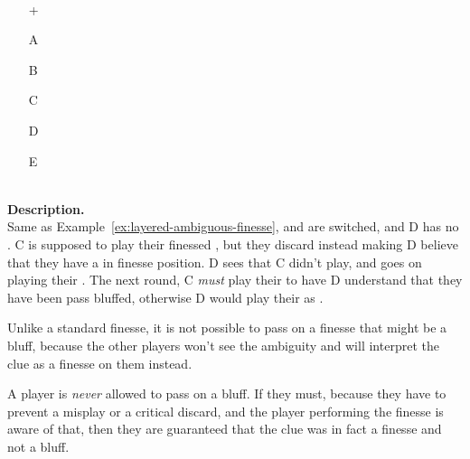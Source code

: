 \begin{example}	\hfill \\
	\begin{minipage}{0.45\textwidth}
		\begin{itemize}
			\item[\Large +]      
			\item[\Large A]    
			\item[\Large B]    
			\item[\Large C]     
			\item[\Large D]    
			\item[\Large E]    
		\end{itemize}
	\end{minipage}%
	\begin{minipage}{0.55\textwidth}
		\hfill \\
		
		\textbf{Description.} \\
		
		Same as Example~\ref{ex:layered-ambiguous-finesse},  and  are switched, and D has no . C is supposed to play their finessed , but they discard instead making D believe that they have a  in finesse position. D sees that C didn't play, and goes on playing their . The next round, C \emph{must} play their  to have D understand that they have been pass bluffed, otherwise D would play their  as .
	\end{minipage}
\end{example} \vspace{0.15 cm}

Unlike a standard finesse, it is not possible to pass on a finesse that might be a bluff, because the other players won't see the ambiguity and will interpret the clue as a finesse on them instead.

\begin{convention}
	A player is \emph{never} allowed to pass on a bluff. If they must, because they have to prevent a misplay or a critical discard, and the player performing the finesse is aware of that, then they are guaranteed that the clue was in fact a finesse and not a bluff.
\end{convention}

